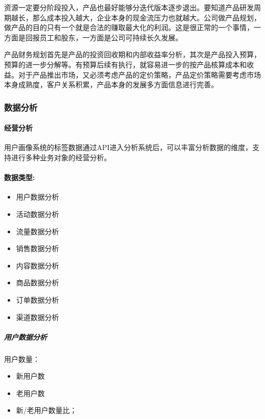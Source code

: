 \documentclass[letterpaper,11pt,english]{sphinxmanual}
\begin{document}
资源一定要分阶段投入，产品也最好能够分迭代版本逐步退出。要知道产品研发周期越长，那么成本投入越大，企业本身的现金流压力也就越大。公司做产品规划，做产品的目的只有一个就是合法的赚取最大化的利润。这是很正常的一个事情，一方面是回报员工和股东，一方面是公司可持续长久发展。

产品财务规划首先是产品的投资回收期和内部收益率分析，其次是产品投入预算，预算的进一步分解等。有预算后续有执行，就容易进一步的按产品核算成本和收益。对于产品推出市场，又必须考虑产品的定价策略，产品定价策略需要考虑市场本身成熟度，客户关系积累，产品本身的发展多方面信息进行完善。


\subsubsection{数据分析}
\label{\detokenize{chapter_skill/data_analysis:id1}}\label{\detokenize{chapter_skill/data_analysis::doc}}

\paragraph{经营分析}
\label{\detokenize{chapter_skill/data_analysis:id2}}
用户画像系统的标签数据通过API进入分析系统后，可以丰富分析数据的维度，支持进行多种业务对象的经营分析。


\paragraph{数据类型:}
\label{\detokenize{chapter_skill/data_analysis:id3}}\begin{itemize}
\item {} 
用户数据分析

\item {} 
活动数据分析

\item {} 
流量数据分析

\item {} 
销售数据分析

\item {} 
内容数据分析

\item {} 
商品数据分析

\item {} 
订单数据分析

\item {} 
渠道数据分析

\end{itemize}


\subparagraph{用户数据分析}
\label{\detokenize{chapter_skill/data_analysis:id4}}
用户数量：
\begin{itemize}
\item {} 
新用户数

\item {} 
老用户数

\item {} 
新/老用户数量比；

\end{itemize}
\end{document}
